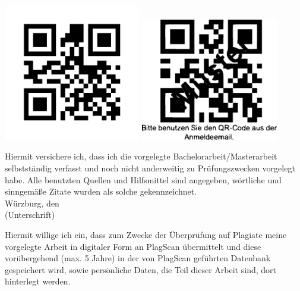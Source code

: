 \documentclass[bt]{dbvdoc}
\begin{document}
\clearpage
  \begin{deckblatt}
  \end{deckblatt}
\clearpage
\mbox{}
\vfill
\begin{center}
\ifpdf
	\includegraphics[width=6cm]{qrcode-thesis.png}
\else
	\includegraphics[width=6cm]{qrcode-thesis.eps}
\fi
\end{center}
\clearpage

\noindent Hiermit versichere ich, dass ich die vorgelegte Bachelorarbeit/Masterarbeit selbstständig verfasst und noch nicht
anderweitig zu Prüfungszwecken vorgelegt habe. Alle benutzten Quellen und Hilfsmittel sind
angegeben, wörtliche und sinngemäße Zitate wurden als solche gekennzeichnet.\\[5mm]
Würzburg, den\\[20mm]
(Unterschrift)

\vfill

\noindent Hiermit willige ich ein, dass zum Zwecke der Überprüfung auf Plagiate meine vorgelegte Arbeit in
digitaler Form an PlagScan übermittelt und diese vorübergehend (max. 5 Jahre)
in der von PlagScan geführten Datenbank gespeichert wird, sowie persönliche Daten, die Teil dieser
Arbeit sind, dort hinterlegt werden.
\end{document}
